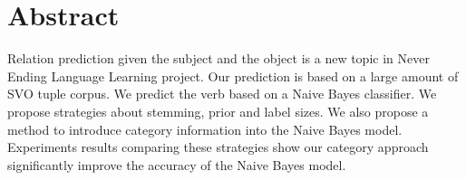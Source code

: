 \section*{Abstract}

Relation prediction given the subject and the object is a new topic in Never Ending Language Learning project. Our prediction is based on a large amount of SVO tuple corpus. We predict the verb based on a Naive Bayes classifier. We propose strategies about stemming, prior and label sizes. We also propose a method to introduce category information into the Naive Bayes model.
Experiments results comparing these strategies show our category approach significantly improve the accuracy of the Naive Bayes model.


